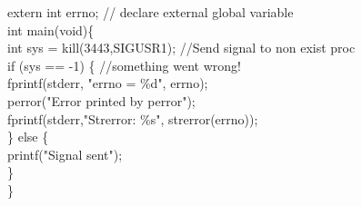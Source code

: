 \begin{flushleft}
\begin{flushleft}
{            extern int errno; // declare external global variable\\
            int main(void)\{ \\
            \halftab int sys = kill(3443,SIGUSR1); //Send signal to non exist proc\\
            \halftab if (sys == -1) \{ //something went wrong!\\
            \tab fprintf(stderr, "errno = \%d\n", errno); \\
            \tab perror("Error printed by perror");\\
            \tab fprintf(stderr,"Strerror: \%s\n", strerror(errno));\\
            \halftab \} else \{\\
            \tab printf("Signal sent\n");\\
            \halftab \}\\
            \}}
  \end{flushleft}
\end{flushleft}
